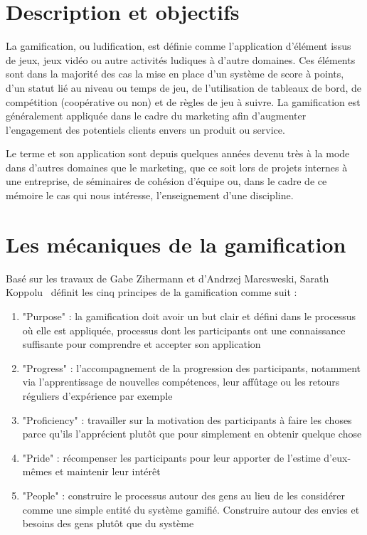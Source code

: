 \section{Description et objectifs}
La gamification, ou ludification, est définie comme l’application d’élément issus de jeux, jeux vidéo ou autre activités ludiques à d’autre domaines. Ces éléments sont dans la majorité des cas la mise en place d’un système de score à points, d’un statut lié au niveau ou temps de jeu, de l’utilisation de tableaux de bord, de compétition (coopérative ou non) et de règles de jeu à suivre. La gamification est généralement appliquée dans le cadre du marketing afin d’augmenter l’engagement des potentiels clients envers un produit ou service.\par
Le terme et son application sont depuis quelques années devenu très à la mode dans d’autres domaines que le marketing, que ce soit lors de projets internes à une entreprise, de séminaires de cohésion d’équipe ou, dans le cadre de ce mémoire le cas qui nous intéresse, l’enseignement d’une discipline.

\section{Les mécaniques de la gamification}
Basé sur les travaux de Gabe Zihermann et d'Andrzej Marcsweski, Sarath Koppolu~\cite{gamif-thesis} définit les cinq principes de la gamification comme suit : 
\begin{enumerate}
    \item "Purpose" : la gamification doit avoir un but clair et défini dans le processus où elle est appliquée, processus dont les participants ont une connaissance suffisante pour comprendre et accepter son application
    \item "Progress" : l’accompagnement de la progression des participants, notamment via l’apprentissage de nouvelles compétences, leur affûtage ou les retours réguliers d’expérience par exemple
    \item "Proficiency" : travailler sur la motivation des participants à faire les choses parce qu’ils l’apprécient plutôt que pour simplement en obtenir quelque chose
    \item "Pride" : récompenser les participants pour leur apporter de l’estime d’eux-mêmes et maintenir leur intérêt
    \item "People" : construire le processus autour des gens au lieu de les considérer comme une simple entité du système gamifié. Construire autour des envies et besoins des gens plutôt que du système
\end{enumerate}\par

